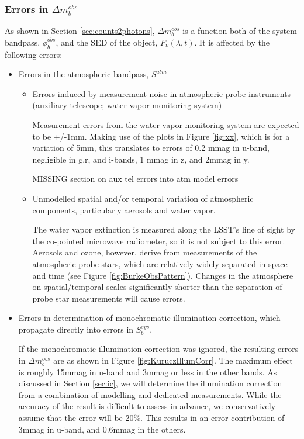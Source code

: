 \documentclass[12pt,preprint]{aastex}
\begin{document}
\subsubsection{Errors in $\Delta m_b^{obs}$}
As shown in Section \ref{sec:counts2photons}, $\Delta m_b^{obs}$ is a function both of the system bandpass, $\phi_b^{obs}$, and the SED of the object, $F_{\nu}(\lambda, t)$.   It is affected by the following errors:
\begin{itemize}
\item{Errors in the atmospheric bandpass, $S^{atm}$
	\begin{itemize}
	\item{Errors induced by measurement noise in atmospheric probe instruments (auxiliary telescope; water vapor monitoring system)}
	
	Measurement errors from the water vapor monitoring system are expected to be +/-1mm.  Making use of the plots in 
	Figure \ref{fig:xx}, which is for a variation of 5mm, this translates to errors of 0.2 mmag in u-band, 
	negligible in g,r, and i-bands, 1 mmag in z, and 2mmag in y.
	
	MISSING section on aux tel errors into atm model errors
	 
	\item{Unmodelled spatial and/or temporal variation of atmospheric components, particularly aerosols and water vapor.}
	
	The water vapor extinction is measured along the LSST's line of sight by the co-pointed microwave radiometer, so it is 
	not subject to this error.   Aerosols and ozone, however, derive from measurements of the atmospheric probe stars, which are
	relatively widely separated in space and time (see Figure \ref{fig:BurkeObsPattern}).  Changes in the atmosphere on
	spatial/temporal scales significantly shorter than the separation of probe star measurements will cause errors.
	
	\end{itemize}
	}
\item{Errors in determination of monochromatic illumination correction, which propagate directly into errors in $S_b^{sys}$.  

If the monochromatic illumination correction was ignored, the resulting errors in $\Delta m_b^{obs}$ are as shown in Figure \ref{fig:KuruczIllumCorr}.  The maximum effect is roughly 15mmag in u-band and 3mmag or less in the other bands.  As discussed in Section \ref{sec:ic}, we will determine the illumination correction from a combination of modelling and dedicated measurements.
While the accuracy of the result is difficult to assess in advance, we conservatively assume that the error will be 20\%. 
This results in an error contribution of 3mmag in u-band, and 0.6mmag in the others.
}


\end{itemize}
\end{document}
